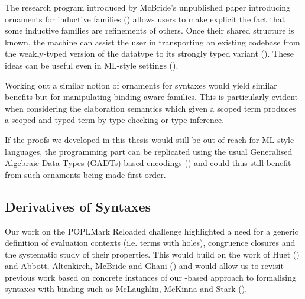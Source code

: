 The research program introduced by McBride's unpublished paper introducing
ornaments for inductive families (\citeyear{mcbride2010ornamental}) allows users
to make explicit the fact that some inductive families are refinements of
others.
Once their shared structure is known, the machine can assist the user in
transporting an existing codebase from the weakly-typed version of the datatype
to its strongly typed variant (\cite{dagand_mcbride_2014}). These ideas can be
useful even in ML-style settings (\cite{Williams:2014:OP:2633628.2633631}).

Working out a similar notion of ornaments for syntaxes would yield similar
benefits but for manipulating binding-aware families. This is particularly
evident when considering the elaboration semantics which given a scoped term
produces a scoped-and-typed term by type-checking or type-inference.

If the proofs we developed in this thesis would still be out of reach for
ML-style languages, the programming part can be replicated using the usual
Generalised Algebraic Data Types (GADTs) based encodings
(\cite{danvytagless,lindley2014hasochism}) and could thus still benefit from
such ornaments being made first order.

\subsection{Derivatives of Syntaxes}

Our work on the POPLMark Reloaded challenge highlighted a need for a generic
definition of evaluation contexts (i.e. terms with holes), congruence closures
and the systematic study of their properties. This would build on the work of
Huet (\citeyear{huet_1997}) and Abbott, Altenkirch, McBride and Ghani
(\citeyear{abbott2005data}) and would allow us to revisit previous work
based on concrete instances of our -based approach to
formalising syntaxes with binding such as McLaughlin, McKinna and
Stark (\citeyear{craig2018triangle}).
